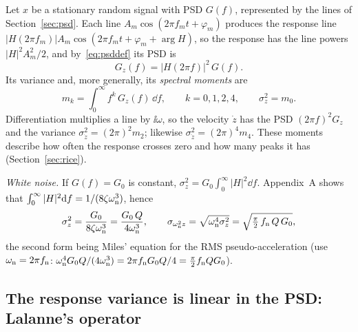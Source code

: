 Let $x$ be a stationary random signal with PSD $G(f)$, represented by the lines of
Section~\ref{sec:psd}. Each line $A_m\cos(2\pi f_m t+\varphi_m)$ produces the response line
$|H(2\pi f_m)|A_m\cos(2\pi f_m t+\varphi_m+\arg H)$, so the response has the line powers
$|H|^2A_m^2/2$, and by~\eqref{eq:psddef} its PSD is
\begin{equation}\label{eq:Gz}
  G_z(f) = |H(2\pi f)|^2\, G(f).
\end{equation}
Its variance and, more generally, its \emph{spectral moments} are
\begin{equation}\label{eq:moments}
  m_k = \int_0^\infty f^k\, G_z(f)\,\dd f,\qquad k = 0,1,2,4,\qquad \sigma_z^2 = m_0 .
\end{equation}
Differentiation multiplies a line by $\ii\omega$, so the velocity $\dot z$ has the PSD
$(2\pi f)^2G_z$ and the variance $\sigma_{\dot z}^2 = (2\pi)^2 m_2$; likewise $\sigma_{\ddot z}^2 =
(2\pi)^4 m_4$. These moments describe how often the response crosses zero and how many peaks it has
(Section~\ref{sec:rice}).

\emph{White noise.} If $G(f)=G_0$ is constant, $\sigma_z^2 = G_0\int_0^\infty |H|^2\dd f$. Appendix~A
shows that $\int_0^\infty|H|^2\mathrm{d} f = 1/(8\zeta\omega_{\mathrm{n}}^3)$, hence
\begin{equation}\label{eq:miles}
  \sigma_z^2 = \frac{G_0}{8\zeta\omega_{\mathrm{n}}^3} = \frac{G_0\,Q}{4\omega_{\mathrm{n}}^3},
  \qquad
  \sigma_{\omega_{\mathrm{n}}^2 z} = \sqrt{\omega_{\mathrm{n}}^4\sigma_z^2} = \sqrt{\tfrac{\pi}{2}\,f_{\mathrm{n}}\, Q\, G_0},
\end{equation}
the second form being Miles' equation for the RMS pseudo-acceleration (use $\omega_{\mathrm{n}} = 2\pi f_{\mathrm{n}}$:
$\omega_{\mathrm{n}}^4 G_0Q/(4\omega_{\mathrm{n}}^3) = 2\pi f_{\mathrm{n}} G_0 Q/4 = \tfrac{\pi}{2}f_{\mathrm{n}} QG_0$).

\subsection{The response variance is linear in the PSD: Lalanne's operator}\label{sec:lalanne}

